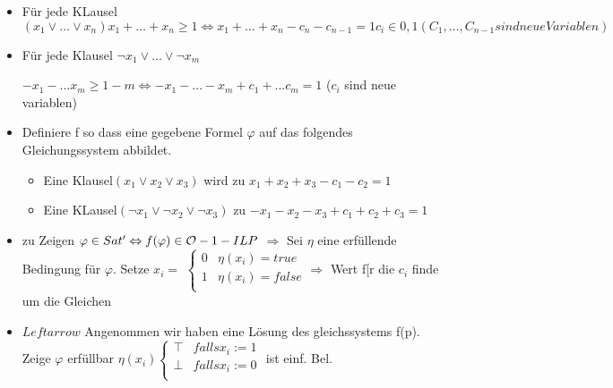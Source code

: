 \documentclass[12pt, oneside, a4paper, numbers=enddot, abstracton, parskip=full]{scrreprt}
\begin{document}
\begin{itemize}
\item Für jede KLausel
  \begin{math}
  (x_1 \vee \dots \vee x_n)
    x_1 + \dots + x_n \geq 1
    \Leftrightarrow
    x_1 + \dots + x_n - c_n - c_{n-1} = 1   c_i \in {0,1}
    (C_1, \dots , C_{n-1} sind neue Variablen)
   \end{math}
\item Für jede Klausel $\neg x_1 \vee \dots \vee \neg x_m$

  \begin{math}
    -x_1 - \dots x_m \geq 1 - m
    \Leftrightarrow -x_1 - \dots -x_m + c_1 + \dots c_m = 1
  \end{math} ($c_i$ sind neue variablen)

\item Definiere f so dass eine gegebene Formel $\varphi$ auf das folgendes
  Gleichungssystem abbildet.
  \begin{itemize}
  \item Eine Klausel$(x_1 \vee x_2 \vee x_3)$ wird zu
    $x_1 + x_2 + x_3 - c_1 - c_2 = 1$
  \item Eine KLausel$(\neg x_1 \vee \neg  x_2 \vee \neg x_3)$ zu
        $-x_1 -x_2 - x_3 + c_1 + c_2 + c_3= 1$
  \end{itemize}
\item zu Zeigen $\varphi \in Sat' \Leftrightarrow f(\varphi) \in \mathcal{O} -1 -ILP$
  $\Rightarrow$ Sei $\eta$ eine erfüllende Bedingung für $\varphi$.
  Setze $x_i =$
  \begin{math}
  \begin{cases}
    0 & \eta (x_i) = true \\
    1 & \eta (x_i) = false \\
  \end{cases}
  \Rightarrow
  \end{math}
  Wert f[r die $c_i$ finde um die Gleichen
  \item $Leftarrow$ Angenommen wir haben eine Lösung des gleichssystems f(p). Zeige $\varphi$
    erfüllbar
    \begin{math}
      \eta (x_i)
      \begin{cases}
        \top & falls x_i := 1 \\
        \bot & falls x_i := 0 \\
      \end{cases}
    \end{math}
      ist einf. Bel.
\end{itemize}
\end{document}
